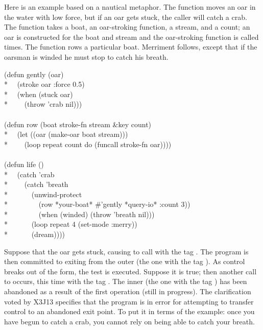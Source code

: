 \begin{defspec}
\begin{newer}
Here is an example based on a nautical metaphor.  The function 
moves an oar in the water with low force, but if an oar gets stuck, the caller
will catch a crab.  The function 
takes a boat, an oar-stroking function,
a stream, and a count; an oar is constructed for the boat and stream
and the oar-stroking function is called  times.
The function  rows a particular boat.
Merriment follows, except that if the oarsman is winded he must stop
to catch his breath.
\begin{lisp}
(defun gently (oar) \\*
~~(stroke oar :force 0.5) \\*
~~(when (stuck oar) \\*
~~~~(throw 'crab nil))) \\
\\
(defun row (boat stroke-fn stream \&key count) \\*
~~(let ((oar (make-oar boat stream))) \\*
~~~~(loop repeat count do (funcall stroke-fn oar)))) \\
\\
(defun life () \\*
~~(catch 'crab \\*
~~~~(catch 'breath \\*
~~~~~~(unwind-protect \\*
~~~~~~~~(row *your-boat* \#'gently *query-io* :count 3)) \\*
~~~~~~~~(when (winded) (throw 'breath nil))) \\*
~~~~~~(loop repeat 4 (set-mode :merry)) \\*
~~~~~~(dream))))
\end{lisp}
Suppose that the oar gets stuck, causing  to call 
with the tag .
The program is then committed to exiting from the outer  (the one
with the tag ).  As control breaks out of the  form,
the  test is executed.  Suppose it is true; then another call to 
occurs, this time with the tag .  The inner  (the one with
the tag ) has been abandoned as a result of the first
 operation (still in progress).  The clarification voted by X3J13
specifies that the program is in error for attempting to transfer control
to an abandoned exit point.  To put it in terms of the example: once you have
begun to catch
a crab, you cannot rely on being able to catch your breath.


\end{newer}
\end{defspec}
